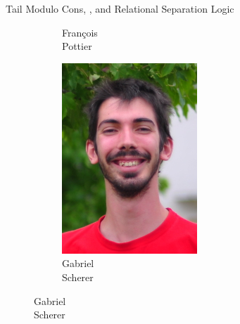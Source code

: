 \begin{frame}{Tail Modulo Cons, \OCaml, and Relational Separation Logic}
\begin{figure}
\begin{subfigure}[b]{0.16\textwidth}
    \caption*{\footnotesize François \\ Pottier}
  \end{subfigure}
  \begin{subfigure}[b]{0.16\textwidth}
    \includegraphics[scale=1.2]{images/gabriel_scherer.jpg}
    \caption*{\footnotesize Gabriel \\ Scherer}
  \end{subfigure}
\end{figure}
\end{frame}
